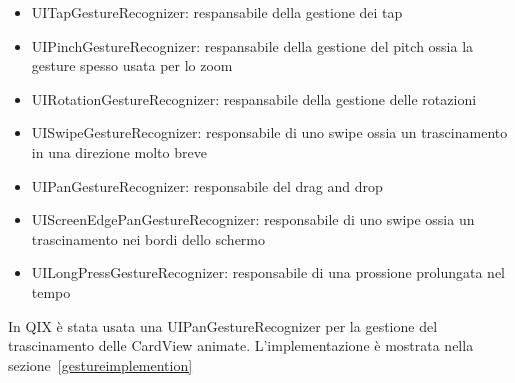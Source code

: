 \begin{itemize}
    \item UITapGestureRecognizer: respansabile della gestione dei tap

    \item UIPinchGestureRecognizer: respansabile della gestione del pitch ossia la gesture spesso usata per lo zoom
    
    \item UIRotationGestureRecognizer: respansabile della gestione delle rotazioni
    
    \item UISwipeGestureRecognizer: responsabile di uno swipe ossia un trascinamento in una direzione molto breve
    
    \item UIPanGestureRecognizer: responsabile del drag and drop
    
    \item UIScreenEdgePanGestureRecognizer: responsabile di uno swipe ossia un trascinamento nei bordi dello schermo
    
    \item UILongPressGestureRecognizer: responsabile di una prossione prolungata nel tempo
\end{itemize}

In QIX è stata usata una UIPanGestureRecognizer per la gestione del trascinamento delle CardView animate.
L'implementazione è mostrata nella sezione~\ref{gestureimplemention}